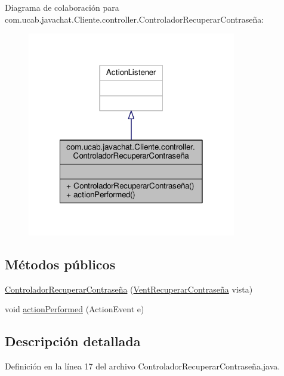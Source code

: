 Diagrama de colaboración para com.\-ucab.\-javachat.\-Cliente.\-controller.\-Controlador\-Recuperar\-Contraseña\-:\nopagebreak
\begin{figure}[H]
\begin{center}
\leavevmode
\includegraphics[width=258pt]{classcom_1_1ucab_1_1javachat_1_1_cliente_1_1controller_1_1_controlador_recuperar_contrase_xC3_xB1a__coll__graph}
\end{center}
\end{figure}
\subsection*{Métodos públicos}
\begin{DoxyCompactItemize}
\item 
\hyperlink{classcom_1_1ucab_1_1javachat_1_1_cliente_1_1controller_1_1_controlador_recuperar_contrase_xC3_xB1a_a9bf650dbd9bd8af042b92a43baa80111}{Controlador\-Recuperar\-Contraseña} (\hyperlink{classcom_1_1ucab_1_1javachat_1_1_cliente_1_1view_1_1_vent_recuperar_contrase_xC3_xB1a}{Vent\-Recuperar\-Contraseña} vista)
\item 
void \hyperlink{classcom_1_1ucab_1_1javachat_1_1_cliente_1_1controller_1_1_controlador_recuperar_contrase_xC3_xB1a_a3e2d23c7eea7fa3a47b41cb6638d2335}{action\-Performed} (Action\-Event e)
\end{DoxyCompactItemize}


\subsection{Descripción detallada}


Definición en la línea 17 del archivo Controlador\-Recuperar\-Contraseña.\-java.



